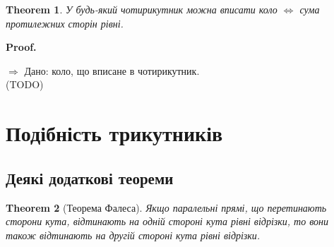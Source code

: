 \documentclass[a4paper, 10pt]{article}
\makeatletter
\def\rightproof{$\boxed{\Rightarrow}$ }
\def\qed{$\blacksquare$}
\theoremstyle{theoremdd}
\newtheorem{theorem}{Theorem}[subsection]
\theoremstyle{theoremdd}
\theoremstyle{theoremdd}
\theoremstyle{theoremdd}
\theoremstyle{theoremdd}
\theoremstyle{theoremdd}
\theoremstyle{theoremdd}
\theoremstyle{theoremdd}
\theoremstyle{theoremdd}
\renewenvironment{proof}[1][Proof.\\]{\par
\pushQED{\hfill \qed}%
\normalfont \topsep6\p@\@plus6\p@\relax
\trivlist
\item\relax
{\bfseries
#1\@addpunct{.}}\hspace\labelsep\ignorespaces
}{%
\popQED\endtrivlist\@endpefalse
}
\makeatother
\begin{document}
\begin{theorem}
У будь-який чотирикутник можна вписати коло $\iff$ сума протилежних сторін рівні.
\end{theorem}

\begin{proof}
\rightproof Дано: коло, що вписане в чотирикутник.\\
(TODO)
\end{proof}
\newpage

\section{Подібність трикутників}
\subsection{Деякі додаткові теореми}
\begin{theorem}[Теорема Фалеса]
Якщо паралельні прямі, що перетинають сторони кута, відтинають на одній стороні кута рівні відрізки, то вони також відтинають на другій стороні кута рівні відрізки.
\end{theorem}
\end{document}
